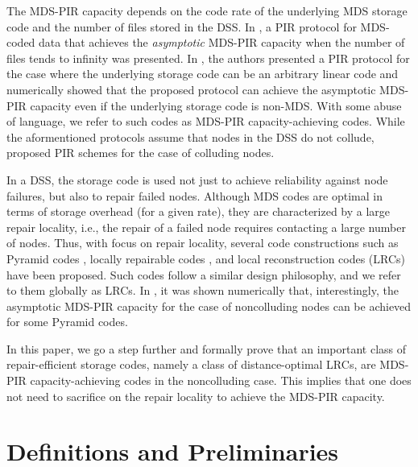 \documentclass[twocolumn,conference]{IEEEtran}
\begin{document}
The MDS-PIR capacity depends on the code rate of the underlying MDS storage code and the number of files stored in the DSS. In \cite{taj16}, a PIR protocol for MDS-coded data that achieves the \emph{asymptotic} MDS-PIR capacity when the number of files tends to infinity was presented. In \cite{Kum17b}, the authors presented a PIR  protocol for the case where the underlying storage code can be an arbitrary linear code and numerically showed that the proposed protocol can achieve the asymptotic MDS-PIR capacity even if the underlying storage code is non-MDS. With some abuse of language,  we refer to such codes as MDS-PIR capacity-achieving codes. While the aformentioned protocols assume that nodes in the DSS do not collude,  \cite{FreijHollantiGnilkeHollantiKarpuk17_1,FreijHollantiGnilkeHollanti17_1sub, KumarLinRosnesGraell17_1sub,taj18} proposed PIR schemes for the case of colluding nodes. %

In a DSS, the storage code is used not just to achieve reliability against node failures, but also to repair failed nodes. 
Although MDS codes are optimal in terms of storage overhead (for a given rate), they are characterized by a large repair locality, i.e., the repair of a failed node requires contacting a large number of nodes.
Thus, with  focus on repair locality, several code constructions such as Pyramid codes \cite{Hua07}, locally repairable codes \cite{Sat13}, and local reconstruction codes (LRCs) \cite{Hua12} have been proposed. Such codes follow a similar design philosophy, and we refer to them globally as LRCs. In \cite{Kum17b}, it was shown numerically that, interestingly, the asymptotic MDS-PIR capacity for the case of noncolluding nodes can be achieved for some Pyramid codes. 

In this paper, we go a step further and formally prove that an important class of repair-efficient storage codes, namely a class of distance-optimal LRCs, are MDS-PIR capacity-achieving codes in the noncolluding case. This implies that one does not need to sacrifice on  the repair locality to achieve the MDS-PIR capacity. 

\section{Definitions and Preliminaries}
\end{document}
